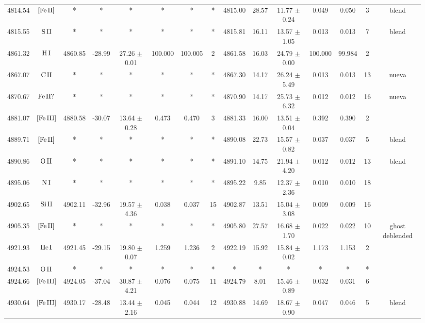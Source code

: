 \documentclass{article}
\begin{document}
\begin{table*}
\begin{adjustbox}{width=\textwidth}
\begin{tabular}{ccccccccccccccc}
4814.54 & $\mbox{[Fe}\thinspace \mbox{II]}$ & * & * & * & * & * & * & 4815.00 & 28.57 & 11.77 $\pm$ 0.24 & 0.049 & 0.050 & 3 &  blend \\
4815.55 & $\mbox{S}\thinspace \mbox{II}$ & * & * & * & * & * & * & 4815.81 & 16.11 & 13.57 $\pm$ 1.05 & 0.013 & 0.013 & 7 &  blend \\
4861.32 & $\mbox{H}\thinspace \mbox{I}$ & 4860.85 & -28.99 & 27.26 $\pm$ 0.01 & 100.000 & 100.005 & 2 & 4861.58 & 16.03 & 24.79 $\pm$ 0.00 & 100.000 & 99.984 & 2 &  \\
4867.07 & $\mbox{C}\thinspace \mbox{II}$ & * & * & * & * & * & * & 4867.30 & 14.17 & 26.24 $\pm$ 5.49 & 0.013 & 0.013 & 13 &  nueva \\
4870.67 & $\mbox{Fe}\thinspace \mbox{II?}$ & * & * & * & * & * & * & 4870.90 & 14.17 & 25.73 $\pm$ 6.32 & 0.012 & 0.012 & 16 &  nueva \\
4881.07 & $\mbox{[Fe}\thinspace \mbox{III]}$ & 4880.58 & -30.07 & 13.64 $\pm$ 0.28 & 0.473 & 0.470 & 3 & 4881.33 & 16.00 & 13.51 $\pm$ 0.04 & 0.392 & 0.390 & 2 &  \\
4889.71 & $\mbox{[Fe}\thinspace \mbox{II]}$ & * & * & * & * & * & * & 4890.08 & 22.73 & 15.57 $\pm$ 0.82 & 0.037 & 0.037 & 5 &  blend \\
4890.86 & $\mbox{O}\thinspace \mbox{II}$ & * & * & * & * & * & * & 4891.10 & 14.75 & 21.94 $\pm$ 4.20 & 0.012 & 0.012 & 13 &  blend \\
4895.06 & $\mbox{N}\thinspace \mbox{I}$ & * & * & * & * & * & * & 4895.22 & 9.85 & 12.37 $\pm$ 2.36 & 0.010 & 0.010 & 18 &  \\
4902.65 & $\mbox{Si}\thinspace \mbox{II}$ & 4902.11 & -32.96 & 19.57 $\pm$ 4.36 & 0.038 & 0.037 & 15 & 4902.87 & 13.51 & 15.04 $\pm$ 3.08 & 0.009 & 0.009 & 16 &  \\
4905.35 & $\mbox{[Fe}\thinspace \mbox{II]}$ & * & * & * & * & * & * & 4905.80 & 27.57 & 16.68 $\pm$ 1.70 & 0.022 & 0.022 & 10 &  ghost deblended \\
4921.93 & $\mbox{He}\thinspace \mbox{I}$ & 4921.45 & -29.15 & 19.80 $\pm$ 0.07 & 1.259 & 1.236 & 2 & 4922.19 & 15.92 & 15.84 $\pm$ 0.02 & 1.173 & 1.153 & 2 &  \\
4924.53 & $\mbox{O}\thinspace \mbox{II}$ & * & * & * & * & * & * & * & * & * & * & * & * &  \\
4924.66 & $\mbox{[Fe}\thinspace \mbox{III]}$ & 4924.05 & -37.04 & 30.87 $\pm$ 4.21 & 0.076 & 0.075 & 11 & 4924.79 & 8.01 & 15.46 $\pm$ 0.89 & 0.032 & 0.031 & 6 &  \\
4930.64 & $\mbox{[Fe}\thinspace \mbox{III]}$ & 4930.17 & -28.48 & 13.44 $\pm$ 2.16 & 0.045 & 0.044 & 12 & 4930.88 & 14.69 & 18.67 $\pm$ 0.90 & 0.047 & 0.046 & 5 &  blend \\

\end{tabular}
\end{adjustbox}
\end{table*}
\end{document}
